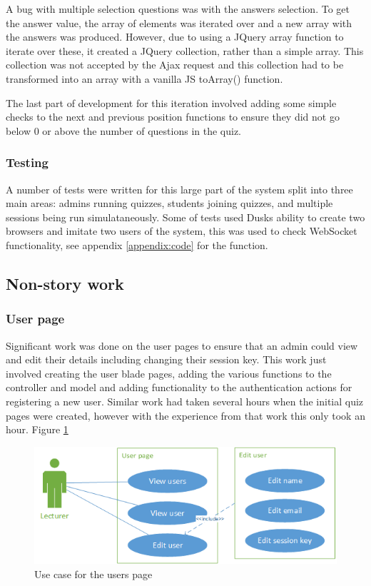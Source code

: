 A bug with multiple selection questions was with the answers selection. To get the answer value, the array of elements was iterated over and a new array with the answers was produced. However, due to using a JQuery array function to iterate over these, it created a JQuery collection, rather than a simple array. This collection was not accepted by the Ajax request and this collection had to be transformed into an array with a vanilla JS toArray() function.

The last part of development for this iteration involved adding some simple checks to the next and previous position functions to ensure they did not go below 0 or above the number of questions in the quiz.

\subsubsection{Testing}
A number of tests were written for this large part of the system split into three main areas: admins running quizzes, students joining quizzes, and multiple sessions being run simulataneously. Some of tests used Dusks ability to create two browsers and imitate two users of the system, this was used to check WebSocket functionality, see appendix \ref{appendix:code} for the function.
\newpage

\subsection{Non-story work}
\subsubsection{User page}
Significant work was done on the user pages to ensure that an admin could view and edit their details including changing their session key. This work just involved creating the user blade pages, adding the various functions to the controller and model and adding functionality to the authentication actions for registering a new user. Similar work had taken several hours when the initial quiz pages were created, however with the experience from that work this only took an hour. Figure \ref{fig:iter-5-users-use-case}

\begin{figure}[H]
	\caption{Use case for the users page}
	\centerline{\includegraphics{Chapter2/Iter-5/iter-5-users-use-case}}
	\label{fig:iter-5-users-use-case}
\end{figure}

